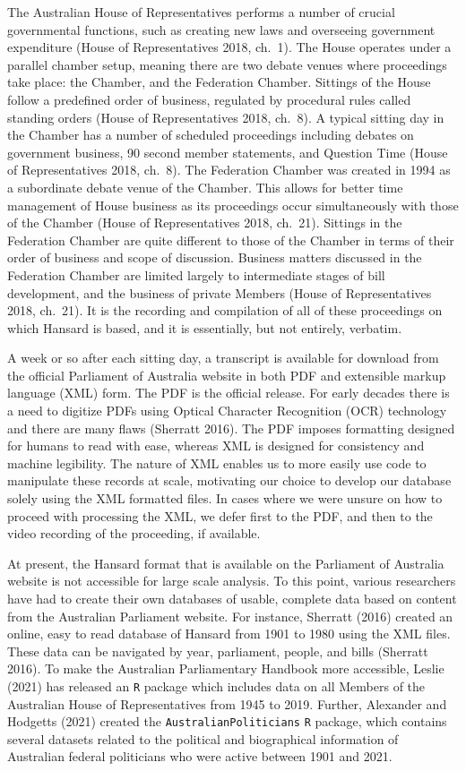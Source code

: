 \documentclass[
  letterpaper,
  DIV=11,
  numbers=noendperiod]{scrartcl}
\begin{document}
The Australian House of Representatives performs a number of crucial
governmental functions, such as creating new laws and overseeing
government expenditure (House of Representatives 2018, ch.~1). The House
operates under a parallel chamber setup, meaning there are two debate
venues where proceedings take place: the Chamber, and the Federation
Chamber. Sittings of the House follow a predefined order of business,
regulated by procedural rules called standing orders (House of
Representatives 2018, ch.~8). A typical sitting day in the Chamber has a
number of scheduled proceedings including debates on government
business, 90 second member statements, and Question Time (House of
Representatives 2018, ch.~8). The Federation Chamber was created in 1994
as a subordinate debate venue of the Chamber. This allows for better
time management of House business as its proceedings occur
simultaneously with those of the Chamber (House of Representatives 2018,
ch.~21). Sittings in the Federation Chamber are quite different to those
of the Chamber in terms of their order of business and scope of
discussion. Business matters discussed in the Federation Chamber are
limited largely to intermediate stages of bill development, and the
business of private Members (House of Representatives 2018, ch.~21). It
is the recording and compilation of all of these proceedings on which
Hansard is based, and it is essentially, but not entirely, verbatim.

A week or so after each sitting day, a transcript is available for
download from the official Parliament of Australia website in both PDF
and extensible markup language (XML) form. The PDF is the official
release. For early decades there is a need to digitize PDFs using
Optical Character Recognition (OCR) technology and there are many flaws
(Sherratt 2016). The PDF imposes formatting designed for humans to read
with ease, whereas XML is designed for consistency and machine
legibility. The nature of XML enables us to more easily use code to
manipulate these records at scale, motivating our choice to develop our
database solely using the XML formatted files. In cases where we were
unsure on how to proceed with processing the XML, we defer first to the
PDF, and then to the video recording of the proceeding, if available.

At present, the Hansard format that is available on the Parliament of
Australia website is not accessible for large scale analysis. To this
point, various researchers have had to create their own databases of
usable, complete data based on content from the Australian Parliament
website. For instance, Sherratt (2016) created an online, easy to read
database of Hansard from 1901 to 1980 using the XML files. These data
can be navigated by year, parliament, people, and bills (Sherratt 2016).
To make the Australian Parliamentary Handbook more accessible, Leslie
(2021) has released an \texttt{R} package which includes data on all
Members of the Australian House of Representatives from 1945 to 2019.
Further, Alexander and Hodgetts (2021) created the
\texttt{AustralianPoliticians} \texttt{R} package, which contains
several datasets related to the political and biographical information
of Australian federal politicians who were active between 1901 and 2021.
\end{document}
